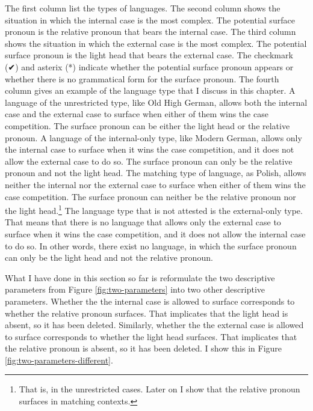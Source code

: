 The first column list the types of languages.
The second column shows the situation in which the internal case is the most complex. The potential surface pronoun is the relative pronoun that bears the internal case.
The third column shows the situation in which the external case is the most complex. The potential surface pronoun is the light head that bears the external case.
The checkmark (✔) and asterix (*) indicate whether the potential surface pronoun appears or whether there is no grammatical form for the surface pronoun.
The fourth column gives an example of the language type that I discuss in this chapter.
A language of the unrestricted type, like Old High German, allows both the internal case and the external case to surface when either of them wins the case competition. The surface pronoun can be either the light head or the relative pronoun.
A language of the internal-only type, like Modern German, allows only the internal case to surface when it wins the case competition, and it does not allow the external case to do so. The surface pronoun can only be the relative pronoun and not the light head.
The matching type of language, as Polish, allows neither the internal nor the external case to surface when either of them wins the case competition. The surface pronoun can neither be the relative pronoun nor the light head.\footnote{
That is, in the unrestricted cases. Later on I show that the relative pronoun surfaces in matching contexts.
}
The language type that is not attested is the external-only type. That means that there is no language that allows only the external case to surface when it wins the case competition, and it does not allow the internal case to do so. In other words, there exist no language, in which the surface pronoun can only be the light head and not the relative pronoun.

What I have done in this section so far is reformulate the two descriptive parameters from Figure \ref{fig:two-parameters} into two other descriptive parameters.
Whether the the internal case is allowed to surface corresponds to whether the relative pronoun surfaces. That implicates that the light head is absent, so it has been deleted.
Similarly, whether the the external case is allowed to surface corresponds to whether the light head surfaces. That implicates that the relative pronoun is absent, so it has been deleted.
I show this in Figure \ref{fig:two-parameters-different}.


